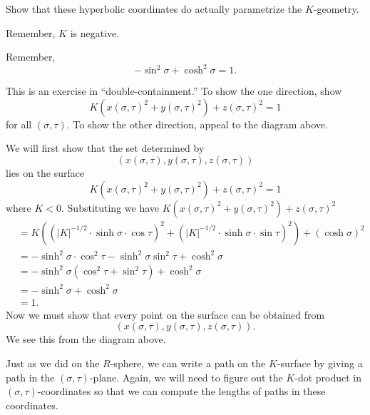 \documentclass{ximera}
\begin{document}
\begin{problem}
Show that these hyperbolic coordinates do actually parametrize the
$K$-geometry.
\begin{hint}
  Remember, $K$ is negative.
\end{hint}
\begin{hint}
  Remember,
  \[
  -\sin^2\sigma + \cosh^2\sigma =1.
  \]
\end{hint}
\begin{hint}
  This is an exercise in ``double-containment.'' To show the one
  direction, show
\[
K\left(x(\sigma,\tau)^{2}+y(\sigma,\tau)^{2}\right)+z(\sigma,\tau)^{2}
= 1
\]
for all $(\sigma,\tau)$. To show the other direction, appeal to the
diagram above.
\end{hint}
\begin{freeResponse}
  We will first show that the set determined by
  \[
  \left(x(\sigma,\tau), y(\sigma,\tau), z(\sigma,\tau)\right)
  \]
  lies on the surface
  \[
  K\left(x(\sigma,\tau) ^{2}+y(\sigma,\tau) ^{2}\right) +z(\sigma,\tau)^{2} = 1
  \]
  where $K<0$. Substituting we have
  $K\left(x(\sigma,\tau) ^{2}+y(\sigma,\tau) ^{2}\right)
  +z(\sigma,\tau)^{2}$
  \begin{align*}
    &=K\left((|K|^{-1/2}\cdot\sinh\sigma\cdot\cos\tau)^{2}+(|K|^{-1/2}\cdot\sinh\sigma\cdot\sin\tau)^{2}\right) +(\cosh\sigma)^{2} \\
    &= -\sinh^2\sigma\cdot\cos^2\tau-\sinh^2\sigma\sin^2\tau + \cosh^2\sigma \\
    &= -\sinh^2\sigma(\cos^2\tau+\sin^2\tau) + \cosh^2\sigma \\
    &= -\sinh^2\sigma + \cosh^2\sigma \\
    &=1.
  \end{align*}
  Now we must show that every point on the surface can be obtained from
  \[
  \left(x(\sigma,\tau), y(\sigma,\tau), z(\sigma,\tau)\right).
  \]
  We see this from the diagram above. 
\end{freeResponse}
\end{problem}

Just as we did on the $R$-sphere, we can write a path on the
$K$-surface by giving a path in the $(\sigma,\tau)$-plane. Again, we
will need to figure out the $K$-dot product in
$(\sigma,\tau)$-coordinates so that we can compute the lengths of
paths in these coordinates.
\end{document}
